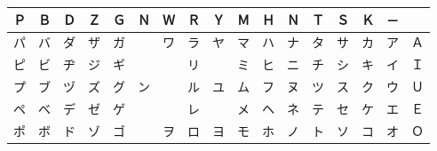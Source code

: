 \begin{center}
\begin{tabular}{|ccccc|c|cccccccccc|c|}
\hline
Ｐ & Ｂ & Ｄ & Ｚ & Ｇ & Ｎ & Ｗ & Ｒ & Ｙ & Ｍ & Ｈ & Ｎ & Ｔ & Ｓ & Ｋ & － & 　 \\\hline
パ & バ & ダ & ザ & ガ & 　 & ワ & ラ & ヤ & マ & ハ & ナ & タ & サ & カ & ア & Ａ \\
ピ & ビ & ヂ & ジ & ギ & 　 & 　 & リ & 　 & ミ & ヒ & ニ & チ & シ & キ & イ & Ｉ \\
プ & ブ & ヅ & ズ & グ & ン & 　 & ル & ユ & ム & フ & ヌ & ツ & ス & ク & ウ & Ｕ \\
ペ & ベ & デ & ゼ & ゲ & 　 & 　 & レ & 　 & メ & ヘ & ネ & テ & セ & ケ & エ & Ｅ \\
ポ & ボ & ド & ゾ & ゴ & 　 & ヲ & ロ & ヨ & モ & ホ & ノ & ト & ソ & コ & オ & Ｏ \\
\hline
\end{tabular}
\end{center}
